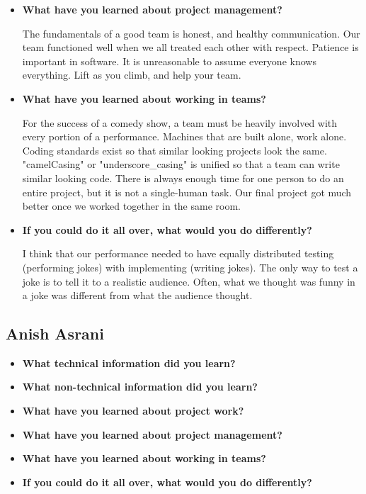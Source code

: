 \documentclass[onecolumn, draftclsnofoot,10pt, compsoc]{IEEEtran}
\begin{document}
\begin{itemize}
\item{\textbf{What have you learned about project management?}}

    The fundamentals of a good team is honest, and healthy communication.
    Our team functioned well when we all treated each other with respect.
    Patience is important in software. It is unreasonable to assume everyone knows everything.
    Lift as you climb, and help your team.


\item{\textbf{What have you learned about working in teams?}}

        For the success of a comedy show, a team must be heavily involved with every portion of a performance.
        Machines that are built alone, work alone. Coding standards exist so that similar looking projects look the same.
        "camelCasing" or "underscore\_casing" is unified so that a team can write similar looking code.
        There is always enough time for one person to do an entire project, but it is not a single-human task.
        Our final project got much better once we worked together in the same room.


\item{\textbf{If you could do it all over, what would you do differently?}}

    I think that our performance needed to have equally distributed testing (performing jokes) with implementing (writing jokes).
	 The only way to test a joke is to tell it to a realistic audience.
	 Often, what we thought was funny in a joke was different from what the audience thought.
	 
	 \end{itemize}







\pagebreak

\subsection{Anish Asrani}

\begin{itemize}
\item{\textbf{What technical information did you learn?}}

\item{\textbf{What non-technical information did you learn?}}

\item{\textbf{What have you learned about project work?}}

\item{\textbf{What have you learned about project management?}}


\item{\textbf{What have you learned about working in teams?}}


\item{\textbf{If you could do it all over, what would you do differently?}}
\end{itemize}
\end{document}
